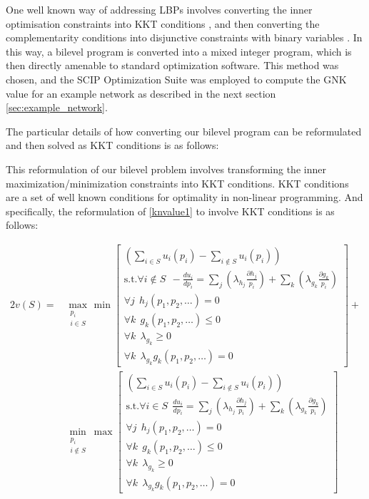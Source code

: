 One well known way of addressing LBPs involves converting the inner optimisation constraints into KKT conditions \cite{kuhn1951nonlinear}, and then converting the complementarity conditions into disjunctive constraints with binary variables \cite{Fortuny-Amat1981,Pineda2018}.
In this way, a bilevel program is converted into a mixed integer program, which is then directly amenable to standard optimization software.
This method was chosen, and the SCIP Optimization Suite \cite{MaherFischerGallyetal.2017} was employed to compute the GNK value for an example network as described in the next section \ref{sec:example_network}.

The particular details of how converting our bilevel program can be reformulated and then solved as KKT conditions is as follows:

This reformulation of our bilevel problem involves transforming the inner maximization/minimization constraints into KKT conditions.
KKT conditions are a set of well known conditions for optimality in non-linear programming.
And specifically, the reformulation of \eqref{knvalue1} to involve KKT conditions is as follows:

\begin{equation}
\label{kkt_optimization1}
\begin{aligned}
2v(S) =& 
\max_{\substack{p_i \\ i\in S}}\min\left[\substack{
	\left(\sum_{i\in S}u_i(p_i) - \sum_{i\notin S}u_i(p_i)\right)\\
	\text{s.t.}\forall i\notin S~~-\frac{d u_i}{d p_i}=\sum_j(\lambda_{h_j}\frac{\partial h_j}{p_i}) + \sum_k(\lambda_{g_k}\frac{\partial g_k}{p_i})\\
	\forall j~~ h_j(p_1,p_2,\dots)=0\\
	\forall k~~ g_k(p_1,p_2,\dots)\le 0\\
	\forall k~~ \lambda_{g_k} \ge 0\\
	\forall k~~ \lambda_{g_k}g_k(p_1,p_2,\dots)= 0}
\right] +\\
&\min_{\substack{p_i \\ i\notin S}}\max\left[\substack{
	\left(\sum_{i\in S}u_i(p_i) - \sum_{i\notin S}u_i(p_i)\right)\\
	\text{s.t.}\forall i\in S~~\frac{d u_i}{d p_i}=\sum_j(\lambda_{h_j}\frac{\partial h_j}{p_i}) + \sum_k(\lambda_{g_k}\frac{\partial g_k}{p_i})\\
	\forall j~~ h_j(p_1,p_2,\dots)=0\\
	\forall k~~ g_k(p_1,p_2,\dots)\le 0\\
	\forall k~~ \lambda_{g_k} \ge 0\\
	\forall k~~ \lambda_{g_k}g_k(p_1,p_2,\dots)= 0}
\right]
\end{aligned}
\end{equation}

